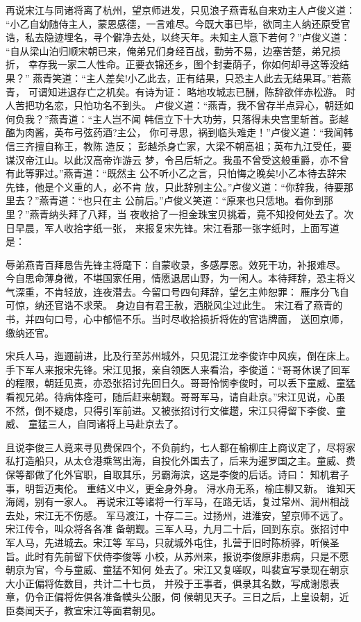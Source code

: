 再说宋江与同诸将离了杭州，望京师进发，只见浪子燕青私自来劝主人卢俊义道：
“小乙自幼随侍主人，蒙恩感德，一言难尽。今既大事已毕，欲同主人纳还原受官
诰，私去隐迹埋名，寻个僻净去处，以终天年。未知主人意下若何？”卢俊义道：
“自从梁山泊归顺宋朝已来，俺弟兄们身经百战，勤劳不易，边塞苦楚，弟兄损折，
幸存我一家二人性命。正要衣锦还乡，图个封妻荫子，你如何却寻这等没结果？”
燕青笑道：“主人差矣!小乙此去，正有结果，只恐主人此去无结果耳。”若燕青，
可谓知进退存亡之机矣。有诗为证：
略地攻城志已酬，陈辞欲伴赤松游。
时人苦把功名恋，只怕功名不到头。
卢俊义道：“燕青，我不曾存半点异心，朝廷如何负我？”燕青道：“主人岂不闻
韩信立下十大功劳，只落得未央宫里斩首。彭越醢为肉酱，英布弓弦药酒?主公，
你可寻思，祸到临头难走！”卢俊义道：“我闻韩信三齐擅自称王，教陈造反；
彭越杀身亡家，大梁不朝高祖；英布九江受任，要谋汉帝江山。以此汉高帝诈游云
梦，令吕后斩之。我虽不曾受这般重爵，亦不曾有此等罪过。”燕青道：“既然主
公不听小乙之言，只怕悔之晚矣!小乙本待去辞宋先锋，他是个义重的人，必不肯
放，只此辞别主公。”卢俊义道：“你辞我，待要那里去？”燕青道：“也只在主
公前后。”卢俊义笑道：“原来也只恁地。看你到那里？”燕青纳头拜了八拜，当
夜收拾了一担金珠宝贝挑着，竟不知投何处去了。次日早晨，军人收拾字纸一张，
来报复宋先锋。宋江看那一张字纸时，上面写道是：

辱弟燕青百拜恳告先锋主将麾下：自蒙收录，多感厚恩。效死干功，补报难尽。
今自思命薄身微，不堪国家任用，情愿退居山野，为一闲人。本待拜辞，恐主将义
气深重，不肯轻放，连夜潜去。今留口号四句拜辞，望乞主帅恕罪：
雁序分飞自可惊，纳还官诰不求荣。
身边自有君王赦，洒脱风尘过此生。
宋江看了燕青的书，并四句口号，心中郁悒不乐。当时尽收拾损折将佐的官诰牌面，
送回京师，缴纳还官。

宋兵人马，迤逦前进，比及行至苏州城外，只见混江龙李俊诈中风疾，倒在床上。
手下军人来报宋先锋。宋江见报，亲自领医人来看治，李俊道：“哥哥休误了回军
的程限，朝廷见责，亦恐张招讨先回日久。哥哥怜悯李俊时，可以丢下童威、童猛
看视兄弟。待病体痊可，随后赶来朝觐。哥哥军马，请自赴京。”宋江见说，心虽
不然，倒不疑虑，只得引军前进。又被张招讨行文催趱，宋江只得留下李俊、童威、
童猛三人，自同诸将上马赴京去了。

且说李俊三人竟来寻见费保四个，不负前约，七人都在榆柳庄上商议定了，尽将家
私打造船只，从太仓港乘驾出海，自投化外国去了，后来为暹罗国之主。童威、费
保等都做了化外官职，自取其乐，另霸海滨，这是李俊的后话。诗曰：
知机君子事，明哲迈夷伦。
重结义中义，更全身外身。
浔水舟无系，榆庄柳又新。
谁知天海阔，别有一家人。
再说宋江等诸将一行军马，在路无话，复过常州、润州相战去处，宋江无不伤感。
军马渡江，十存二三。过扬州，进淮安，望京师不远了。宋江传令，叫众将各各准
备朝觐。三军人马，九月二十后，回到东京。张招讨中军人马，先进城去。宋江等
军马，只就城外屯住，扎营于旧时陈桥驿，听候圣旨。此时有先前留下伏侍李俊等
小校，从苏州来，报说李俊原非患病，只是不愿朝京为官，今与童威、童猛不知何
处去了。宋江又复嗟叹，叫裴宣写录现在朝京大小正偏将佐数目，共计二十七员，
并殁于王事者，俱录其名数，写成谢恩表章，仍令正偏将佐俱各准备幞头公服，伺
候朝见天子。三日之后，上皇设朝，近臣奏闻天子，教宣宋江等面君朝见。

